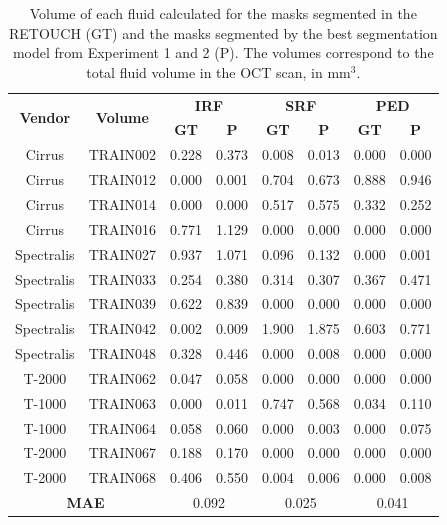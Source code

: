 \begin{table}[!ht]
	\centering
	\caption{Volume of each fluid calculated for the masks segmented in the RETOUCH (GT) and the masks segmented by the best segmentation model from Experiment 1 and 2 (P). The volumes correspond to the total fluid volume in the OCT scan, in mm$^{3}$.}
	\begin{tabular}{|c|c|cc|cc|cc|}
		\hline
		\multirow{2}{*}{\textbf{Vendor}} & \multirow{2}{*}{\textbf{Volume}} & \multicolumn{2}{c|}{\textbf{IRF}} & \multicolumn{2}{c|}{\textbf{SRF}} & \multicolumn{2}{c|}{\textbf{PED}} \\ \cline{3-8} 
		& & \textbf{GT} & \textbf{P} & \textbf{GT} & \textbf{P} & \textbf{GT} & \textbf{P} \\ \hline
		 Cirrus & TRAIN002 & 0.228 & 0.373 & 0.008 & 0.013 & 0.000 & 0.000 \\
		 Cirrus & TRAIN012 & 0.000 & 0.001 & 0.704 & 0.673 & 0.888 & 0.946 \\
		 Cirrus & TRAIN014 & 0.000 & 0.000 & 0.517 & 0.575 & 0.332 & 0.252 \\
		 Cirrus & TRAIN016 & 0.771 & 1.129 & 0.000 & 0.000 & 0.000 & 0.000 \\
		 Spectralis & TRAIN027 & 0.937 & 1.071 & 0.096 & 0.132 & 0.000 & 0.001 \\
		 Spectralis & TRAIN033 & 0.254 & 0.380 & 0.314 & 0.307 & 0.367 & 0.471 \\
		 Spectralis & TRAIN039 & 0.622 & 0.839 & 0.000 & 0.000 & 0.000 & 0.000 \\
		 Spectralis & TRAIN042 & 0.002 & 0.009 & 1.900 & 1.875 & 0.603 & 0.771 \\
		 Spectralis & TRAIN048 & 0.328 & 0.446 & 0.000 & 0.008 & 0.000 & 0.000 \\
		 T-2000 & TRAIN062 & 0.047 & 0.058 & 0.000 & 0.000 & 0.000 & 0.000 \\
		 T-1000 & TRAIN063 & 0.000 & 0.011 & 0.747 & 0.568 & 0.034 & 0.110 \\
		 T-1000 & TRAIN064 & 0.058 & 0.060 & 0.000 & 0.003 & 0.000 & 0.075 \\
		 T-2000 & TRAIN067 & 0.188 & 0.170 & 0.000 & 0.000 & 0.000 & 0.000 \\
		 T-2000 & TRAIN068 & 0.406 & 0.550 & 0.004 & 0.006 & 0.000 & 0.008 \\ \hline
		 \multicolumn{2}{|c|}{\textbf{MAE}} & \multicolumn{2}{c|}{0.092} & \multicolumn{2}{c|}{0.025} & \multicolumn{2}{c|}{0.041} \\ \hline
		 
	\end{tabular}
	\label{tab:FluidVolumesExperiment5}
\end{table}


